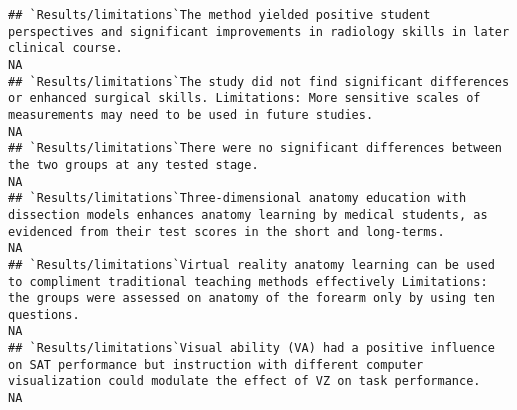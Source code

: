 \documentclass[]{article}
\begin{document}
\begin{verbatim}
## `Results/limitations`The method yielded positive student perspectives and significant improvements in radiology skills in later clinical course.                                                                                                                                                                                                                                                                                                                                      NA
## `Results/limitations`The study did not find significant differences or enhanced surgical skills. Limitations: More sensitive scales of measurements may need to be used in future studies.                                                                                                                                                                                                                                                                                            NA
## `Results/limitations`There were no significant differences between the two groups at any tested stage.                                                                                                                                                                                                                                                                                                                                                                                NA
## `Results/limitations`Three-dimensional anatomy education with dissection models enhances anatomy learning by medical students, as evidenced from their test scores in the short and long-terms.                                                                                                                                                                                                                                                                                       NA
## `Results/limitations`Virtual reality anatomy learning can be used to compliment traditional teaching methods effectively Limitations: the groups were assessed on anatomy of the forearm only by using ten questions.                                                                                                                                                                                                                                                                 NA
## `Results/limitations`Visual ability (VA) had a positive influence on SAT performance but instruction with different computer visualization could modulate the effect of VZ on task performance.                                                                                                                                                                                                                                                                                       NA

\end{verbatim}
\end{document}
